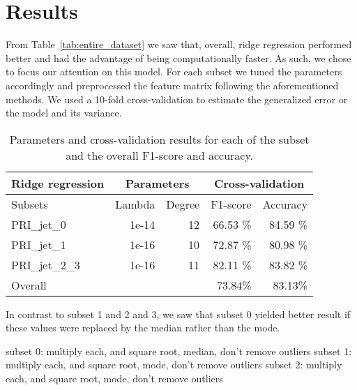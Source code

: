 \documentclass[10pt,conference,compsocconf]{IEEEtran}
\begin{document}
\section{Results}
From Table~\ref{tab:entire_dataset} we saw that, overall, ridge regression
performed better and had the advantage of being computationally faster.
As such, we chose to focus our attention on this model. For each subset we
tuned the parameters accordingly and preprocessed the feature matrix 
following the aforementioned methods. 
We used a 10-fold cross-validation to estimate the generalized error or the 
model and its variance.

\begin{table}[ht]
\centering
\begin{tabular}{@{}lrrrr@{}}
\toprule
Ridge regression & \multicolumn{2}{c}{Parameters}              & \multicolumn{2}{c}{Cross-validation} \\ \midrule
Subsets          & Lambda               & Degree               & F1-score          & Accuracy         \\ \midrule
PRI\_jet\_0      & 1e-14                & 12                   & 66.53 \%          & 84.59 \%         \\
PRI\_jet\_1      & 1e-16                & 10                   & 72.87 \%          & 80.98 \%         \\
PRI\_jet\_2\_3   & 1e-16                & 11                   & 82.11 \%          & 83.82 \%         \\ \midrule
Overall          & \multicolumn{1}{l}{} & \multicolumn{1}{l}{} & 73.84\%           & 83.13\%          \\ \bottomrule
\end{tabular}
\caption{Parameters and cross-validation results for each of the subset and the overall 
F1-score and accuracy.}
\label{tab:cv_results}
\end{table}

In contrast to subset 1 and 2 and 3, we saw that subset 0 yielded better 
result if these values were replaced by the median rather than the mode.

subset 0: multiply each, and square root, median, don't remove outliers
subset 1: multiply each, and square root, mode, don't remove outliers
subset 2: multiply each, and square root, mode, don't remove outliers

\end{document}
